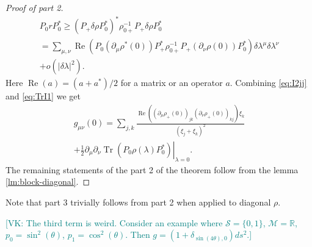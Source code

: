 \documentclass[
  american,aps,pra,reprint,floatfix,nofootinbib,superscriptaddress
]{revtex4-2}
\DeclareMathOperator{\Tr}{Tr}
\DeclareMathOperator{\real}{Re}
\newcommand{\abs}[1]{\left|#1\right|}
\newcommand{\VK}[1]{\textcolor{teal}{[VK: #1]}}
\begin{document}
\begin{proof}[Proof of part 2]
  \begin{multline}
    P_0 r P_0^*
    \geq \left(P_{+} \delta\rho P_0^*\right)^* \rho_{0{+}}^{-1}
      P_{+} \delta\rho P_0^* \\
    = \sum_{\mu,\nu} \real\left(
        P_0 \left(\partial_\mu\rho^*(0)\right)
        P_{+}^* \rho_{0{+}}^{-1}
        P_{+} \left(\partial_\nu\rho(0)\right) P_0^*
      \right)
      \delta\lambda^\mu \delta\lambda^\nu \\
    + o(\abs{\delta \lambda}^2).
  \end{multline}
  Here $\real(a) = (a + a^*) / 2$ for a matrix or an operator $a$.
  Combining \eqref{eq:I2jj} and \eqref{eq:TrI1} we get
  \begin{multline}
    g_{\mu\nu}(0)
    = \sum_{j,k} \frac{
        \real\left(
          (\partial_\mu\rho_{+}(0))_{jk}
          (\partial_\nu\rho_{+}(0))_{kj}
        \right) \xi_k
      }{(\xi_j + \xi_k)^2}\\
    + \frac12 \left.\partial_\mu \partial_\nu \Tr(P_0 \rho(\lambda) P_0^*)
      \right|_{\lambda=0}.
  \end{multline}
  The remaining statements of the part 2 of the theorem follow from the
  lemma \ref{lm:block-diagonal}.
\end{proof}
Note that part 3 trivially follows from part 2 when applied to diagonal $\rho$.

\VK{The third term is weird.
Consider an example where $\mathcal{S} = \{0, 1\}$, $\mathcal{M} = \mathbb{R}$,
$p_0 = \sin^2(\theta)$, $p_1 = \cos^2(\theta)$. Then $g = (1 + \delta_{\sin(4\theta),0}) ds^2$.}
\end{document}

